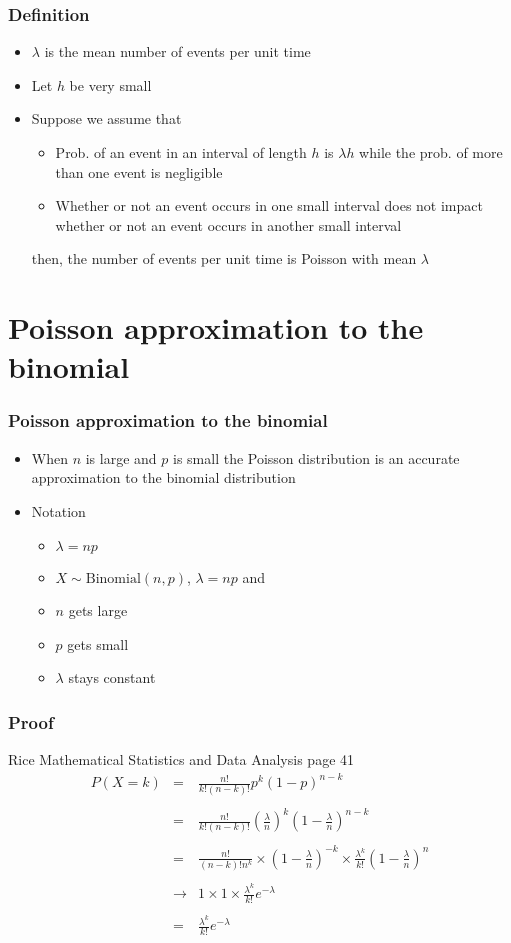 \documentclass[aspectratio=169]{beamer}
\begin{document}
\begin{frame}\frametitle{Definition}
\begin{itemize}
\item $\lambda$ is the mean number of events per unit time
\item Let $h$ be very small 
\item Suppose we assume that 
  \begin{itemize}
  \item Prob. of an event in an interval of length $h$ is $\lambda h$
    while the prob. of more than one event is negligible
  \item Whether or not an event occurs in one small interval
    does not impact whether or not an event occurs in another
    small interval
  \end{itemize}
then, the number of events per unit time is Poisson with mean $\lambda$ 
\end{itemize}
\end{frame}

\section{Poisson approximation to the binomial}
\begin{frame}\frametitle{Poisson approximation to the binomial}
\begin{itemize}
\item When $n$ is large and $p$ is small the Poisson distribution
  is an accurate approximation to the binomial distribution
\item Notation
  \begin{itemize}
  \item $\lambda = n p$
  \item $X \sim \mbox{Binomial}(n, p)$, $\lambda = n p$ and
  \item $n$ gets large 
  \item $p$ gets small
  \item $\lambda$ stays constant
  \end{itemize}
\end{itemize}
\end{frame}

\begin{frame}\frametitle{Proof} Rice Mathematical Statistics and Data Analysis page 41
\begin{eqnarray*}
  P(X = k) & = & \frac{n!}{k!(n-k)!} p^k (1 - p)^{n-k} \\ \\
           & = & \frac{n!}{k!(n-k)!} \left(\frac{\lambda}{n}\right)^k\left(1 - \frac{\lambda}{n}\right)^{n-k} \\ \\
           & = & \frac{n!}{(n-k)!n^k} \times \left(1 - \frac{\lambda}{n}\right)^{-k} \times \frac{\lambda^k}{k!}\left(1 - \frac{\lambda}{n}\right)^n \\ \\
           & \rightarrow & 1 \times 1 \times \frac{\lambda^k}{k!} e^{-\lambda} \\ \\
           & = & \frac{\lambda^k}{k!} e^{-\lambda}
\end{eqnarray*}
\end{frame}
\end{document}
